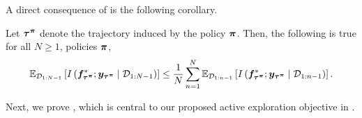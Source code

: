 A direct consequence of  is the following corollary.
\begin{corollary}
\label{cor:mutual_information_and_average_mi}
Let ${\bm{\tau}}^{{\bm{\pi}}}$ denote the trajectory induced by the policy ${\bm{\pi}}$. Then, the following is true for all $N \geq 1$, policies ${\bm{\pi}}$,
\begin{equation*}
     \mathbb{E}_{{\mathcal{D}}_{1:N-1}}\left[I\left({\bm{f}}^*_{{\bm{\tau}}^{{\bm{\pi}}}}; {\bm{y}}_{{\bm{\tau}}^{{\bm{\pi}}}} \mid {\mathcal{D}}_{1:N-1}\right)\right]  \leq \frac{1}{N}\sum^{N}_{n=1} \mathbb{E}_{{\mathcal{D}}_{1:n-1}}\left[I\left({\bm{f}}^*_{{\bm{\tau}}^{{\bm{\pi}}}}; {\bm{y}}_{{\bm{\tau}}^{{\bm{\pi}}}} \mid {\mathcal{D}}_{1:n-1}\right)\right].
\end{equation*}
\end{corollary}
Next, we prove , which is central to our proposed active exploration objective in .
